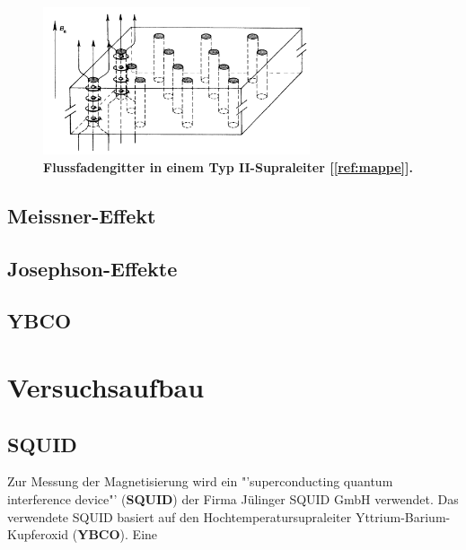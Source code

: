 \documentclass[a4paper,ngerman]{scrartcl}
\begin{document}
\begin{figure}[tb!]
\centering
\includegraphics[width=0.7\textwidth]{abbildungen/typ2_supraleiter.png}
\caption[Versuchsplatz]{\textbf{Flussfadengitter in einem Typ II-Supraleiter [\ref{ref:mappe}].}}
\label{fig:typII}
\end{figure}


\subsection{Meissner-Effekt}
\label{ssec:meissner}

\subsection{Josephson-Effekte}
\label{ssec:josephson}


\subsection{YBCO}

 


\section{Versuchsaufbau}

\subsection{SQUID}

Zur Messung der Magnetisierung wird ein "'superconducting quantum interference device"' (\textbf{SQUID}) der Firma Jülinger SQUID GmbH verwendet. 
Das verwendete SQUID basiert auf den Hochtemperatursupraleiter Yttrium-Barium-Kupferoxid (\textbf{YBCO}).
Eine
\end{document}
